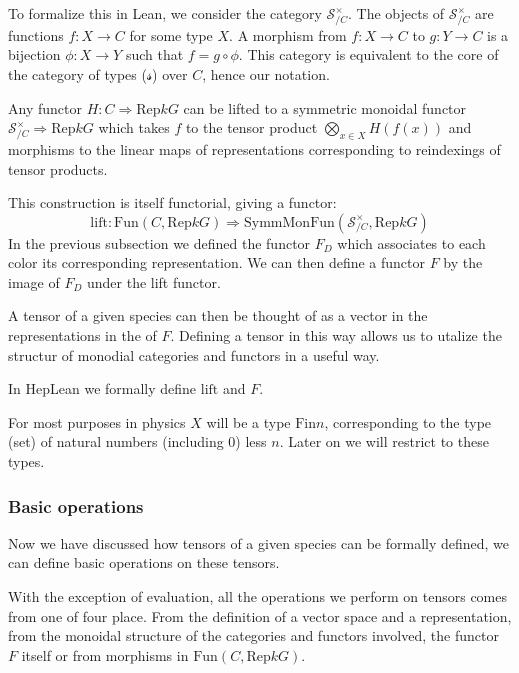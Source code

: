 \documentclass[a4paper, 11pt]{article}
\begin{document}
To formalize this in Lean, we consider the category  $\mathcal{S}_{/C}^\times$. The objects 
of $\mathcal{S}_{/C}^\times$ are functions $f : X \to C$  for some type $X$. 
A morphism from $f : X \to C$ to $g : Y \to C$ is a bijection $\phi : X \to Y$ such that 
$f = g \circ \phi$. 
This category is equivalent to the core of the category of types ($\mathcal{s}$) over $C$, hence 
our notation. 

Any functor $H : C \Rightarrow \mathrm{Rep} k G$ can be lifted to a symmetric monoidal 
functor $\mathcal{S}_{/C}^\times \Rightarrow \mathrm{Rep} k G$ which takes $f$ to the 
tensor product $\bigotimes_{x \in X} H(f(x))$ and morphisms to the linear maps 
of representations corresponding to reindexings of
tensor products.

This construction is itself functorial, 
giving a functor: 
\begin{equation}
  \mathrm{lift} : \mathrm{Fun}(C, \mathrm{Rep} k G) \Rightarrow
  \mathrm{SymmMonFun}(\mathcal{S}_{/C}^\times, \mathrm{Rep} k G)
\end{equation} 
In the previous subsection we defined the functor $F_{D}$ which associates to each color 
its corresponding representation. We can then define a functor $F$ by the image of $F_{D}$ under
the lift functor. 

A tensor of a given species can then be thought of as a vector in the representations in the of $F$.
Defining a tensor in this way allows us to utalize the 
structur of monodial categories and functors in a useful way. 

In HepLean we formally define $\mathrm{lift}$ and $F$. 

For most purposes in physics $X$ will be a type $\mathrm{Fin} n$, corresponding to the type 
(set) of natural numbers (including 0) less $n$. Later on we will restrict to these types.

\subsubsection{Basic operations}

Now we have discussed how tensors of a given species can be formally defined, we can define 
basic operations on these tensors. 

With the exception of evaluation, all the operations we perform on tensors comes from one of four 
place. From the definition of a vector space and a representation, 
from the monoidal structure of the categories and functors involved, the functor $F$ itself
or from morphisms in $\mathrm{Fun}(C, \mathrm{Rep} k G)$. 
\end{document}
